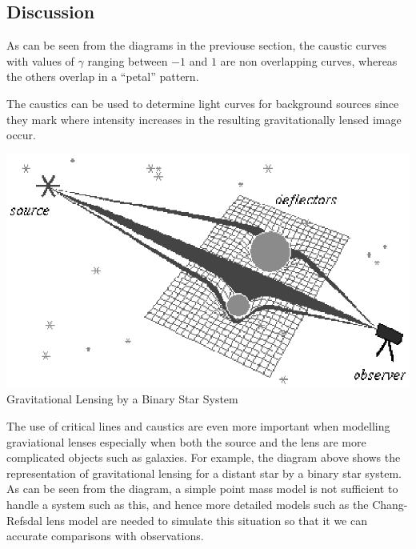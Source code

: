 \documentclass[a4paper]{IEEEtran}
\newcommand{\showcode}[1]{\begin{mdframed}[style=code] %
                          \end{mdframed}%
}
\begin{document}
    \subsection{Discussion}
    As can be seen from the diagrams in the previouse section, 
    the caustic curves with values of $\gamma$ ranging between
    $-1$ and $1$ are non overlapping curves, whereas the others
    overlap in a ``petal'' pattern.

    The caustics can be used to determine light curves for background
    sources since they mark where intensity increases in the resulting
    gravitationally lensed image occur.

    \begin{center}
        \includegraphics{images/lens_model.eps}
        \\[1mm]
        Gravitational Lensing by a Binary Star System
    \end{center}

    The use of critical lines and caustics are even more important
    when modelling graviational lenses especially when both the source
    and the lens are more complicated objects such as galaxies.
    For example, the diagram above shows the representation of 
    gravitational lensing for a distant star by a binary star system.
    As can be seen from the diagram, a simple point mass model is
    not sufficient to handle a system such as this, and hence
    more detailed models such as the Chang-Refsdal lens model
    are needed to simulate this situation so that it we can accurate
    comparisons with observations.


\onecolumn

\showcode{src/caustics.f} 

\newpage 
{} 
\showcode{src/lense.f} 


\end{document}
